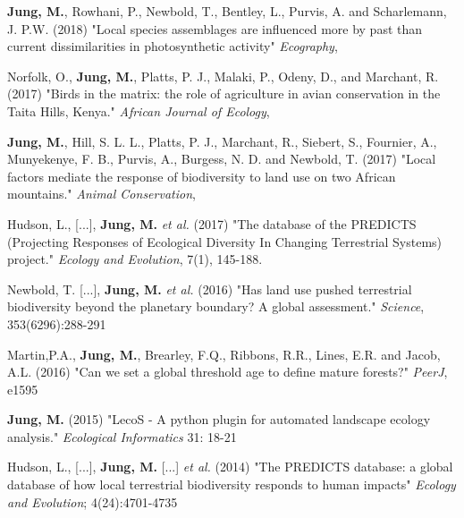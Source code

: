 \documentclass[12pt,a4paper,serif]{moderncv}        %
\begin{document}
 \begin{bibenum}
 
       \item  \textbf{Jung, M.}, Rowhani, P., Newbold, T., Bentley, L., Purvis, A. and Scharlemann, J. P.W. (2018) "Local species assemblages are influenced more by past than current dissimilarities in photosynthetic activity" \emph{Ecography}, 

      \item Norfolk, O., \textbf{Jung, M.}, Platts, P. J., Malaki, P., Odeny, D., and Marchant, R. (2017) "Birds in the matrix: the role of agriculture in avian conservation in the Taita Hills, Kenya." \emph{African Journal of Ecology}, 

      \item \textbf{Jung, M.}, Hill, S. L. L., Platts, P. J., Marchant, R., Siebert, S., Fournier, A., Munyekenye, F. B., Purvis, A., Burgess, N. D. and Newbold, T. (2017) "Local factors mediate the response of biodiversity to land use on two African mountains." \emph{Animal Conservation}, 
      
      \item Hudson, L., [...], \textbf{Jung, M.} \textsl{et al.} (2017) "The database of the PREDICTS (Projecting Responses of Ecological Diversity In Changing Terrestrial Systems)
project." \emph{Ecology and Evolution}, 7(1), 145-188. 
      
      \item Newbold, T. [...], \textbf{Jung, M.} \textsl{et al.} (2016) "Has land use pushed terrestrial biodiversity beyond the planetary boundary? A global assessment." \emph{Science}, 353(6296):288-291 

      \item Martin,P.A., \textbf{Jung, M.}, Brearley, F.Q., Ribbons, R.R., Lines, E.R. and Jacob, A.L. (2016) "Can we set a global threshold age to define mature forests?" \emph{PeerJ},
e1595 

     \item \textbf{Jung, M.} (2015) "LecoS - A python plugin for automated landscape ecology analysis." \emph{Ecological Informatics} 31: 18-21 

     \item Hudson, L., [...], \textbf{Jung, M.} [...] \textit{et al.} (2014) "The PREDICTS database: a global database of how local terrestrial biodiversity responds to human impacts" \emph{Ecology and Evolution}; 4(24):4701-4735 
     
\end{bibenum}
\end{document}
